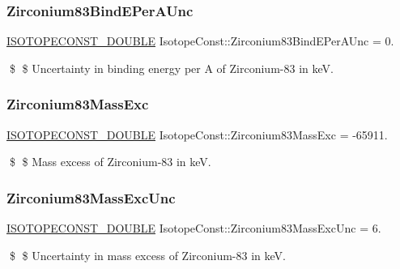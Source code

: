 \subsubsection{\texorpdfstring{Zirconium83\+Bind\+E\+Per\+A\+Unc}{Zirconium83BindEPerAUnc}}
{\footnotesize\ttfamily \mbox{\hyperlink{group___isotope_const-_macros_ga8f45a7272ce02c0b4c65c44636ed719a}{I\+S\+O\+T\+O\+P\+E\+C\+O\+N\+S\+T\+\_\+\+D\+O\+U\+B\+LE}} Isotope\+Const\+::\+Zirconium83\+Bind\+E\+Per\+A\+Unc = 0.}

\$ \$ Uncertainty in binding energy per A of Zirconium-\/83 in keV. \mbox{\label{group___isotope_const-_zirconium-_zr83_gace197774e6069635e576b2cd8bd6bfba}} 
\subsubsection{\texorpdfstring{Zirconium83\+Mass\+Exc}{Zirconium83MassExc}}
{\footnotesize\ttfamily \mbox{\hyperlink{group___isotope_const-_macros_ga8f45a7272ce02c0b4c65c44636ed719a}{I\+S\+O\+T\+O\+P\+E\+C\+O\+N\+S\+T\+\_\+\+D\+O\+U\+B\+LE}} Isotope\+Const\+::\+Zirconium83\+Mass\+Exc = -\/65911.}

\$ \$ Mass excess of Zirconium-\/83 in keV. \mbox{\label{group___isotope_const-_zirconium-_zr83_gaa3d026647909f236da62b869820df78e}} 
\subsubsection{\texorpdfstring{Zirconium83\+Mass\+Exc\+Unc}{Zirconium83MassExcUnc}}
{\footnotesize\ttfamily \mbox{\hyperlink{group___isotope_const-_macros_ga8f45a7272ce02c0b4c65c44636ed719a}{I\+S\+O\+T\+O\+P\+E\+C\+O\+N\+S\+T\+\_\+\+D\+O\+U\+B\+LE}} Isotope\+Const\+::\+Zirconium83\+Mass\+Exc\+Unc = 6.}

\$ \$ Uncertainty in mass excess of Zirconium-\/83 in keV. \mbox{\label{group___isotope_const-_zirconium-_zr83_ga5e4393a75fce9da4c2c9e694ce7f11a3}} 
